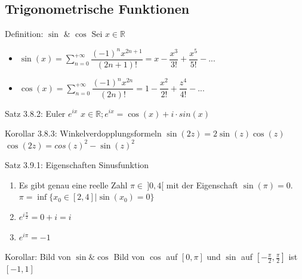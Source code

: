 \documentclass[a4paper,10pt]{article}
\begin{document}
\subsection{Trigonometrische Funktionen}
\begin{defbox}
    {Definition: $\sin$ \& $\cos$}
    Sei $x\in\mathbb R$
    \begin{itemize}
        \item $\sin(x)=\displaystyle\sum_{n=0}^{+\infty}\dfrac{(-1)^nx^{2n+1}}{(2n+1)!}=x-\dfrac{x^3}{3!}+\dfrac{x^5}{5!}-...$
        \item $\cos(x)=\displaystyle\sum_{n=0}^{+\infty}\dfrac{(-1)^nx^{2n}}{(2n)!}=1-\dfrac{x^2}{2!}+\dfrac{z^4}{4!}-...$
    \end{itemize}
\end{defbox}
\begin{tbox}
    {Satz 3.8.2: Euler $e^{ix}$}
    $x\in \mathbb R; e^{ix}=\cos(x)+i\cdot sin(x)$
\end{tbox}
\begin{tbox}
    {Korollar 3.8.3: Winkelverdopplungsformeln}
    $\sin{(2z)}=2\sin{(z)}\cos{(z)}$
    \\ $\cos{(2z)}=cos{(z)}^2-\sin{(z)}^2$
\end{tbox}
\begin{tbox}
    {Satz 3.9.1: Eigenschaften Sinusfunktion}
    \begin{enumerate}
        \item Es gibt genau eine reelle Zahl $\pi\in\ ]0,4[$ mit der Eigenschaft $\sin(\pi)=0$. 
        \\$\pi=\inf\{x_0\in[2,4]|\sin(x_0)=0\}$
        \item $e^{i\frac{\pi}{2}}=0+i=i$
        \item $e^{i\pi}=-1$
    \end{enumerate}
\end{tbox}
\begin{tbox}
    {Korollar: Bild von $\sin \& \cos$}
    Bild von $\cos$ auf $[0,\pi]$ und $\sin$ auf $[-\frac{\pi}{2},\frac{\pi}{2}]$ ist $[-1,1]$
\end{tbox}
\end{document}
